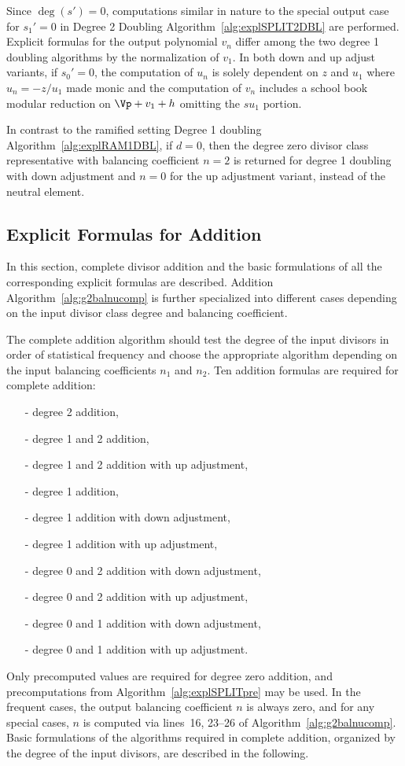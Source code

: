 Since $\deg(s') = 0$, computations similar in nature to the special output case
for $s_1' = 0$ in Degree 2 Doubling Algorithm~\ref{alg:explSPLIT2DBL} are
performed. Explicit formulas for the output polynomial $v_n$ differ among the
two degree 1 doubling algorithms by the normalization of $v_1$. In both down and
up adjust variants, if $s_0' = 0$, the computation of $u_n$ is solely dependent
on $z$ and $u_1$ where $u_n = -z/u_1$ made monic and the computation of $v_n$
includes a school book modular reduction on $\Vp + v_1 + h$ omitting the $su_1$
portion. 

In contrast to the ramified setting Degree 1 doubling
Algorithm~\ref{alg:explRAM1DBL}, if $d = 0$, then the degree zero divisor class
representative with balancing coefficient $n=2$ is returned for degree 1 doubling
with down adjustment and $n=0$ for the up adjustment variant, instead of the
neutral element.



\subsection{Explicit Formulas for Addition}\label{sec:g2SPLITADD}
In this section, complete divisor addition and the basic formulations of all the
corresponding explicit formulas are described. Addition
Algorithm~\ref{alg:g2balnucomp} is further specialized into different cases
depending on the input divisor class degree and balancing coefficient.

The complete addition algorithm should test the degree of the input divisors in
order of statistical frequency and choose the appropriate algorithm depending on
the input balancing coefficients $n_1$ and $n_2$. Ten addition formulas are
required for complete addition:
\begin{itemize}
    \item[-] degree 2 addition,
    \item[-] degree 1 and 2 addition,
    \item[-] degree 1 and 2 addition with up adjustment,
    \item[-] degree 1 addition,
    \item[-] degree 1 addition with down adjustment,
    \item[-] degree 1 addition with up adjustment,
    \item[-] degree 0 and 2 addition with down adjustment,
    \item[-] degree 0 and 2 addition with up adjustment,
    \item[-] degree 0 and 1 addition with down adjustment,
    \item[-] degree 0 and 1 addition with up adjustment. 
\end{itemize}
Only precomputed values are required for degree zero addition, and
precomputations from Algorithm~\ref{alg:explSPLITpre} may be used. In the
frequent cases, the output balancing coefficient $n$ is always zero, and for any
special cases, $n$ is computed via lines~16, 23--26 of
Algorithm~\ref{alg:g2balnucomp}. Basic formulations of the algorithms required
in complete addition, organized by the degree of the input divisors, are
described in the following.


